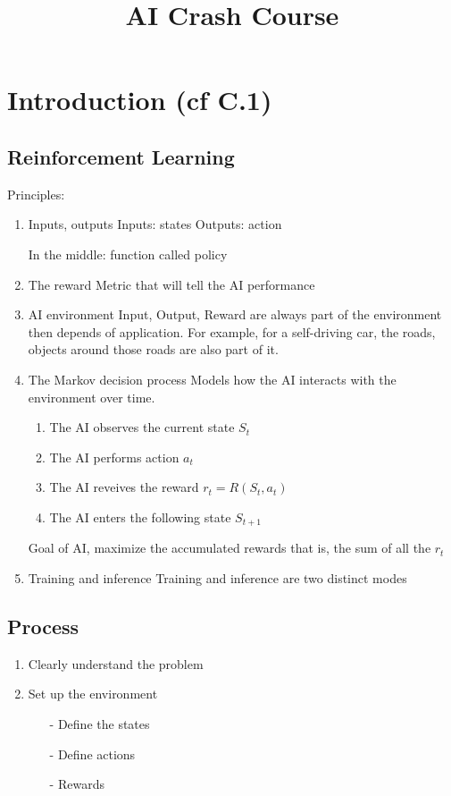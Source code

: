 \documentclass[french]{article}
\title{AI Crash Course}
\begin{document}
\date{}

\maketitle

\section{Introduction (cf C.1)}

\subsection{Reinforcement Learning}
Principles:
\begin{enumerate}
\item{Inputs, outputs}
Inputs: states
Outputs: action

In the middle: function called policy
\item{The reward}
Metric that will tell the AI performance

\item{AI environment}
Input, Output, Reward are always part of the environment then depends of application. For example, for a self-driving car, the roads, objects around those roads are also part of it.
\item{The Markov decision process}
Models how the AI interacts with the environment over time.
\begin{enumerate}
	\item The AI observes the current state $S_t$
	\item The AI performs action $a_t$
	\item The AI reveives the reward $r_t = R(S_t, a_t)$
	\item The AI enters the following state $S_{t+1}$
\end{enumerate}
Goal of AI, maximize the accumulated rewards that is, the sum of all the $r_t$
\item{Training and inference}
Training and inference are two distinct modes
\end{enumerate}

\subsection{Process}
\begin{enumerate}
	\item Clearly understand the problem
	\item Set up the environment
		\begin{itemize}
			\item [-] Define the states
			\item [-] Define actions
			\item [-] Rewards
		\end{itemize}
\end{enumerate}
\end{document}
